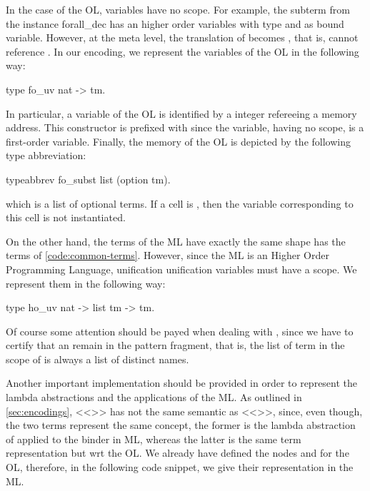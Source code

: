 \documentclass[sigconf,natbib=false]{acmart}
\begin{document}
In the case of the OL, variables have no scope. For example, the subterm
 from the instance forall\_dec has  an higher order
variables with type  and  as bound variable. 
However, at the meta level, the translation of  becomes
, that is,  cannot reference . In our
encoding, we represent the variables of the OL in the following way:

\begin{elpicode}
  type fo_uv nat -> tm.
\end{elpicode}

\noindent 
In particular, a variable of the OL is identified by a integer
refereeing a memory address. This constructor is prefixed with  since
the variable, having no scope, is a first-order variable. Finally, the memory of
the OL is depicted by the following type abbreviation:

\begin{elpicode}
  typeabbrev fo_subst list (option tm).
\end{elpicode}

\noindent 
which is a list of optional terms. If a cell is , then the variable
corresponding to this cell is not instantiated.

On the other hand, the terms of the ML have exactly the same shape
has the terms of \cref{code:common-terms}. However, since the ML is an Higher
Order Programming Language, unification unification variables must have a scope.
We represent them in the following way:

\begin{elpicode}
  type ho_uv nat -> list tm -> tm.
\end{elpicode}

Of course some attention
should be payed when dealing with , since we have to certify
that an  remain in the pattern fragment, that is, the
list of term in the scope of  is always a list of distinct names.

Another important implementation should be provided in order to represent the
lambda abstractions and the applications of the ML. As outlined in
\cref{sec:encodings}, <<>> has not the same semantic as 
<<>>, since, even though, the two terms represent the same
concept, the former is the lambda abstraction of  applied to the 
binder in ML, whereas the latter is the same term representation but wrt the OL.
We already have defined the nodes  and  for the OL,
therefore, in the following code snippet, we give their representation in the
ML.
\end{document}
